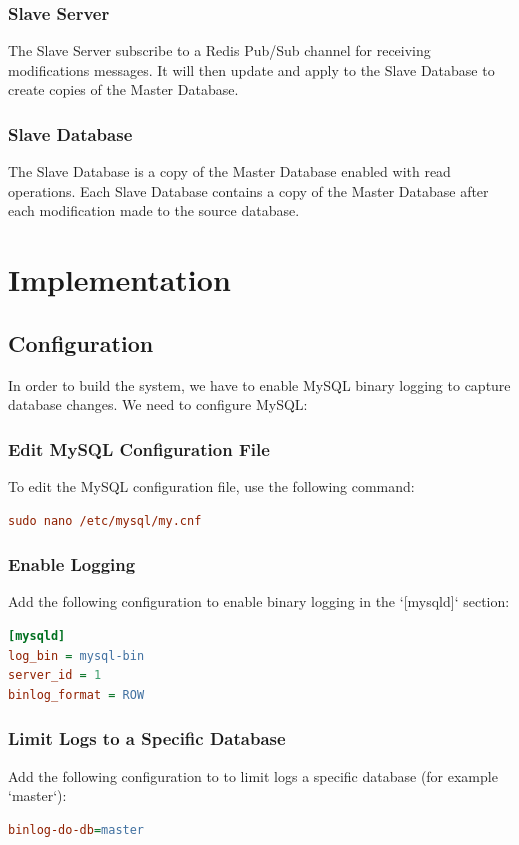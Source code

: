 \documentclass[a4paper,12pt]{report}
\begin{document}
\subsubsection{Slave Server}
The Slave Server subscribe to a Redis Pub/Sub channel for receiving modifications messages. It will then update and apply to the Slave Database to create copies of the Master Database.

\subsubsection{Slave Database}
The Slave Database is a copy of the Master Database enabled with read operations. Each Slave Database contains a copy of the Master Database after each modification made to the source database.

\newpage
\section{\bfseries Implementation}
\fontsize{13}{16}\selectfont
\subsection{Configuration}
In order to build the system, we have to enable MySQL binary logging to capture database changes. We need to configure MySQL:

\subsubsection{Edit MySQL Configuration File}
To edit the MySQL configuration file, use the following command:
\begin{lstlisting}[language=ini, numbers=none]
sudo nano /etc/mysql/my.cnf
\end{lstlisting}

\subsubsection{Enable Logging}
Add the following configuration to enable binary logging in the `[mysqld]` section:
\begin{lstlisting}[language=ini, numbers=none]
[mysqld]
log_bin = mysql-bin
server_id = 1
binlog_format = ROW
\end{lstlisting}

\subsubsection{Limit Logs to a Specific Database}
Add the following configuration to to limit logs a specific database (for example `master`):
\begin{lstlisting}[language=ini, numbers=none]
binlog-do-db=master
\end{lstlisting}
\end{document}
